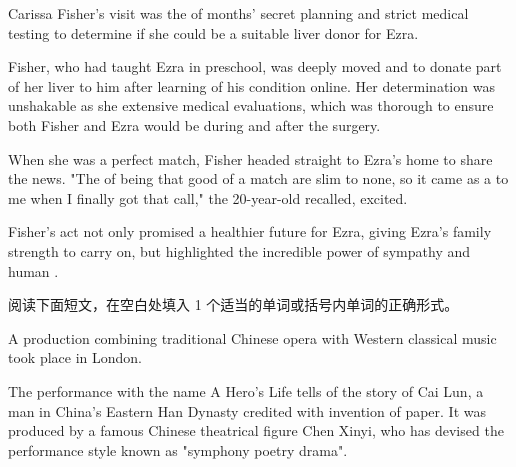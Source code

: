\documentclass{英语试卷}
\begin{document}
\par Carissa Fisher's visit was the  of months' secret planning and strict medical testing to determine if she could be a suitable liver donor for Ezra.\par
\par Fisher, who had taught Ezra in preschool, was deeply moved and  to donate part of her liver to him after learning of his condition online. Her determination was unshakable as she  extensive medical evaluations, which was thorough to ensure both Fisher and Ezra would be  during and after the surgery.\par
\par When  she was a perfect match, Fisher headed straight to Ezra's home to share the news. "The  of being that good of a match are slim to none, so it came as a  to me when I finally got that call," the 20-year-old recalled, excited.\par
\par Fisher's  act not only promised a healthier future for Ezra, giving Ezra's family strength to carry on, but highlighted the incredible power of sympathy and human .\par
{}
\par 阅读下面短文，在空白处填入 1 个适当的单词或括号内单词的正确形式。\par
\par A production combining traditional Chinese opera with Western classical music took place in London.\par
\par The performance with the name A Hero's Life tells of the story of Cai Lun, a man in China's Eastern Han Dynasty credited with  invention of paper. It was produced by a famous Chinese theatrical figure Chen Xinyi, who has devised the performance style known as "symphony poetry drama".\par
\end{document}
